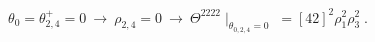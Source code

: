 \begin{equation}\label{5}
  \theta_0 = \theta^+_{2,4}=0\ \rightarrow \ \rho_{2,4}=0 \ \rightarrow\  \Theta^{2222} \mid_{\theta_{0,2,4}=0}\; = [42]^2\rho_1^2\rho_3^2\;.
\end{equation}

